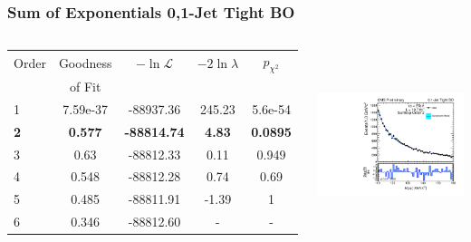 \documentclass{beamer}
\begin{document}
\begin{frame}
\frametitle{Sum of Exponentials 0,1-Jet Tight BO}
  \begin{columns}[c]
   \column{60mm}
      \begin{center}
      \tiny
\begin{tabular}{|l|c|c|c|c|} \hline
Order & Goodness & $-\ln\mathcal{L}$ & $-2\ln\lambda$ & $p_{\chi^2}$ \\ 
 & of Fit  &  & &  \\ \hline \hline
1 & 7.59e-37 & -88937.36 & 245.23 & 5.6e-54  \\ \hline
\bf 2 & \bf 0.577 & \bf -88814.74 & \bf 4.83 & \bf 0.0895  \\ \hline
3 & 0.63 & -88812.33 & 0.11 & 0.949  \\ \hline
4 & 0.548 & -88812.28 & 0.74 & 0.69  \\ \hline
5 & 0.485 & -88811.91 & -1.39 & 1  \\ \hline
6 & 0.346 & -88812.60 & - & -  \\ \hline
\end{tabular}
      \end{center}
   \column{60mm}
      \begin{center}
        \includegraphics[height=55mm]{wholeRangeHggStudy1/plotsOrderStudyExpPow/order_Shape_Jets01PassPtG10BO_SumExp2}
      \end{center}
  \end{columns}
  \begin{center}
  \end{center}
\end{frame}
\end{document}
